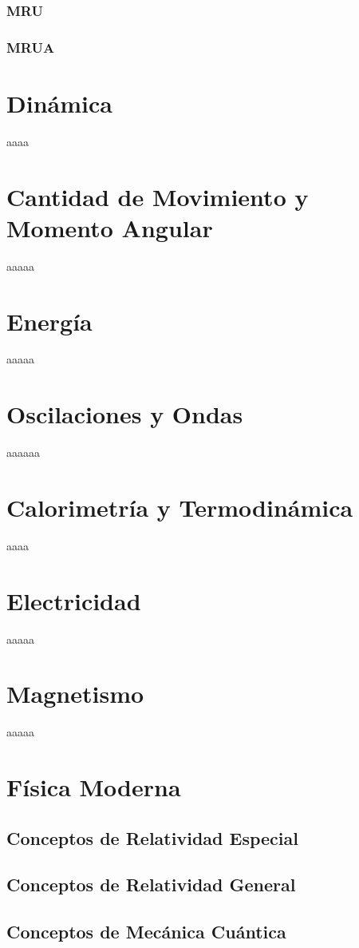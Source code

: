 \documentclass[12pt]{article}
\begin{document}
  \subsubsection{MRU}
  \subsubsection{MRUA}
\section{Dinámica}
aaaa
\section{Cantidad de Movimiento y Momento Angular}
aaaaa
\section{Energ\'ia}
aaaaa
\section{Oscilaciones y Ondas}
aaaaaa
\section{Calorimetr\'ia y Termodinámica}
aaaa
\section{Electricidad}
aaaaa
\section{Magnetismo}
aaaaa
\section{F\'isica Moderna}
 \subsection{Conceptos de Relatividad Especial}
 \subsection{Conceptos de Relatividad General} 
 \subsection{Conceptos de Mecánica Cuántica}
\end{document}

